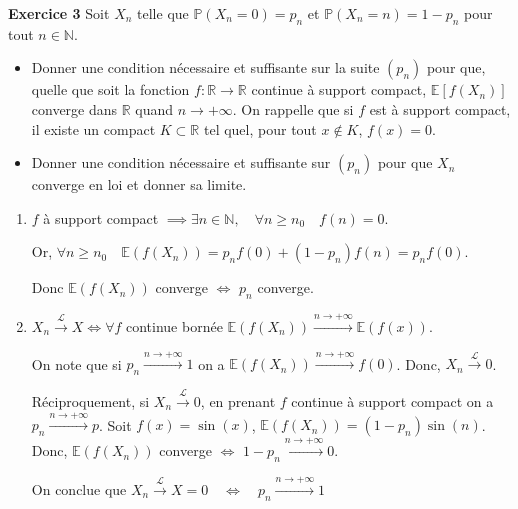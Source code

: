 \documentclass[french]{article}
\begin{document}
	\begin{tcolorbox}[colback=gray!5!white,colframe=gray!75!black]
		\textbf{\large{Exercice 3}} \newline
		Soit $X_n$ telle que $\mathbb{P}(X_n = 0) = p_n$ et $\mathbb{P}(X_n = n) = 1 - p_n$ pour tout $n \in \mathbb{N}$.
		\begin{itemize}
			\item Donner une condition nécessaire et suffisante sur la suite $(p_n)$ pour que, quelle que soit la fonction $f: \mathbb{R} \to \mathbb{R}$ continue à support compact, $\mathbb{E}[f(X_n)]$ converge dans $\mathbb{R}$ quand $n \to + \infty$. On rappelle que si $f$ est à support compact, il existe un compact $K \subset \mathbb{R}$ tel quel, pour tout $x \notin K$, $f(x) = 0$.
			\item Donner une condition nécessaire et suffisante sur $(p_n)$ pour que $X_n$ converge en loi et donner sa limite.
		\end{itemize}
	\end{tcolorbox}

	\begin{enumerate}
		\item
	$f$ à support compact $\implies \exists n \in \mathbb{N}, \quad \forall n \geq n_0 \quad f(n) = 0$.
	
	Or, $\forall n \geq n_0 \quad \mathbb{E}(f(X_n)) = p_nf(0) + (1-p_n)f(n) = p_nf(0)$.
	
	Donc $\mathbb{E}(f(X_n))$ converge $\iff$ $p_n$ converge.
	
		\item
		
	$X_n \xrightarrow{\mathcal{L}} X \iff \forall f$ continue bornée $\mathbb{E}(f(X_n)) \xrightarrow{n \to +\infty} \mathbb{E}(f(x)) $.
	
	On note que si $p_n \xrightarrow{n \to +\infty} 1$ on a $\mathbb{E}(f(X_n)) \xrightarrow{n \to +\infty} f(0)$. Donc, $X_n \xrightarrow{\mathcal{L}} 0$.
	
	Réciproquement, si $X_n \xrightarrow{\mathcal{L}} 0$, en prenant $f$ continue à support compact on a $p_n \xrightarrow{n \to +\infty} p$. Soit $f(x) = \sin(x)$, $\mathbb{E}(f(X_n)) = (1 - p_n)\sin(n)$.
	Donc, $\mathbb{E}(f(X_n))$ converge $\iff$ $1 - p_n \xrightarrow{n \to +\infty} 0$.
	
	On conclue que $X_n \xrightarrow{\mathcal{L}} X = 0 \quad \iff \quad p_n \xrightarrow{n \to +\infty} 1$
	\end{enumerate}
\end{document}
